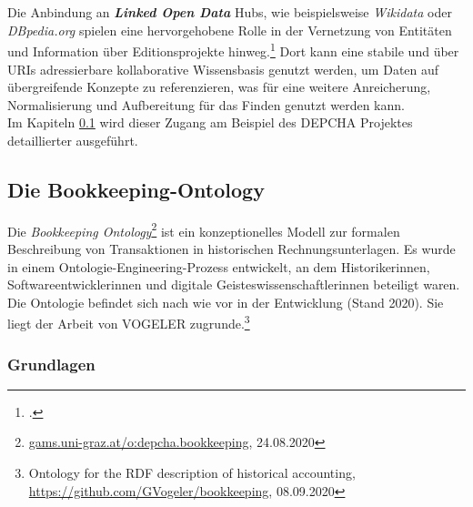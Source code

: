 \documentclass[12pt,a4paper]{article}
\begin{document}
\\
\\
Die Anbindung an \textbf{\textit{Linked Open Data}} Hubs, wie beispielsweise \textit{Wikidata} oder \textit{DBpedia.org} spielen eine hervorgehobene Rolle in der Vernetzung von Entitäten und Information über Editionsprojekte hinweg.\footcite{wettlaufer2018semanticwebEdition} Dort kann eine stabile und über URIs adressierbare kollaborative Wissensbasis genutzt werden, um Daten auf übergreifende Konzepte zu referenzieren, was für eine weitere Anreicherung, Normalisierung und Aufbereitung für das Finden genutzt werden kann. 
\\
Im Kapiteln \ref{BK} wird dieser Zugang am Beispiel des DEPCHA Projektes detaillierter ausgeführt.


\newpage
\subsection{Die Bookkeeping-Ontology}
\label{BK}

Die \textit{Bookkeeping Ontology}\footnote{\url{gams.uni-graz.at/o:depcha.bookkeeping}, 24.08.2020} ist ein konzeptionelles Modell zur formalen Beschreibung von Transaktionen in historischen Rechnungsunterlagen. Es wurde in einem Ontologie-Engineering-Prozess entwickelt, an dem Historikerinnen, Softwareentwicklerinnen und digitale Geisteswissenschaftlerinnen beteiligt waren. Die Ontologie befindet sich nach wie vor in der Entwicklung (Stand 2020). Sie liegt der Arbeit von VOGELER zugrunde.\footnote{Ontology for the RDF description of historical accounting, \url{https://github.com/GVogeler/bookkeeping}, 08.09.2020} 



\subsubsection{Grundlagen}
\end{document}
